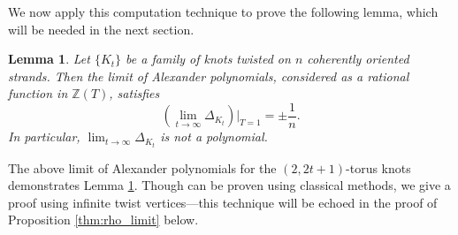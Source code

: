 \documentclass[11pt,hyp,]{nyjm}
\newcommand{\Z}{\mathbb{Z}}
\numberwithin{thm}{section}
\newtheorem{lemma}[thm]{Lemma}
\theoremstyle{definition}
\theoremstyle{remark}
\begin{document}
	We now apply this computation technique to prove the following lemma, which will be needed in the next section.

	\begin{lemma}
		\label{thm:alex_limit}
		Let $\{K_t\}$ be a family of knots twisted on $n$ coherently oriented strands. Then the limit of Alexander polynomials, considered as a rational function in $\Z(T)$, satisfies
		$$
		(\lim_{t \to \infty} \Delta_{K_t})|_{T = 1} = \pm \frac{1}{n}.
		$$
		In particular, $\lim_{t \to \infty} \Delta_{K_t}$ is not a polynomial.
	\end{lemma}
	
	The above limit of Alexander polynomials for the $(2,2t + 1)$-torus knots demonstrates Lemma \ref{thm:alex_limit}. Though  can be proven using classical methods, we give a proof using infinite twist vertices---this technique will be echoed in the proof of Proposition \ref{thm:rho_limit} below.
	
\end{document}
